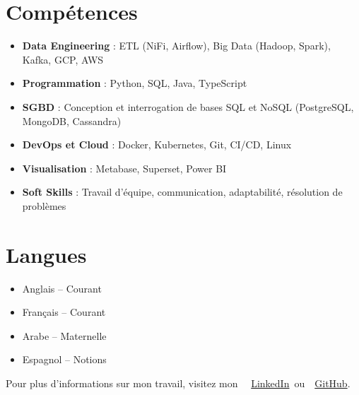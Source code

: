 \documentclass[10pt,a4paper,sans]{moderncv}
\begin{document}
  \section{\fontsize{11}{12.1}\selectfont Compétences}
  \vspace{-6pt}
  \begin{itemize}[leftmargin=0.3cm, itemsep=-2pt, topsep=0pt, partopsep=0pt, parsep=0pt]
    \item \textbf{Data Engineering} : ETL (NiFi, Airflow), Big Data (Hadoop, Spark), Kafka, GCP, AWS
    \item \textbf{Programmation} : Python, SQL, Java, TypeScript
    \item \textbf{SGBD} : Conception et interrogation de bases SQL et NoSQL (PostgreSQL, MongoDB, Cassandra)
    \item \textbf{DevOps et Cloud} : Docker, Kubernetes, Git, CI/CD, Linux
    \item \textbf{Visualisation} : Metabase, Superset, Power BI
    \item \textbf{Soft Skills} : Travail d’équipe, communication, adaptabilité, résolution de problèmes
  \end{itemize} 

  \vspace{-18pt}
  \section{\fontsize{11}{12.1}\selectfont Langues}
  \vspace{-17pt}
  \begin{multicols}{2}
  \begin{itemize}[leftmargin=0.3cm, itemsep=-2pt, topsep=0pt, partopsep=0pt, parsep=0pt]
      \item Anglais – Courant
      \item Français – Courant
      \item Arabe – Maternelle
      \item Espagnol – Notions
  \end{itemize}
  \end{multicols}


  \vspace{-20pt}
  \begin{center}
      {\fontsize{9}{11}\selectfont\color{gray}
      Pour plus d'informations sur mon travail, visitez mon~
      \faLinkedin~\href{https://www.linkedin.com/in/ahmed-makroum/}{LinkedIn}~ou~\faGithub~\href{https://github.com/ahmedmakroum}{GitHub}.}
  \end{center}

  
\end{document}
